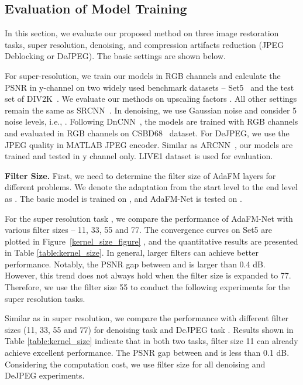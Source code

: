 \documentclass[10pt,twocolumn,letterpaper]{article}
\begin{document}
\subsection{Evaluation of Model Training}
In this section, we evaluate our proposed method on three image restoration tasks, super resolution, denoising, and compression artifacts reduction (JPEG Deblocking or DeJPEG). The basic settings are shown below. 

For super-resolution, we train our models in RGB channels and calculate the PSNR in y-channel on two widely used benchmark datasets -- Set5~\cite{bevilacqua2012low} and the test set of DIV2K~\cite{agustsson2017ntire}. We evaluate our methods on upscaling factors . All other settings remain the same as SRCNN~\cite{dong2014learning}. In denoising, we use Gaussian noise and consider 5 noise levels, i.e., . Following DnCNN~\cite{zhang2017beyond}, the models are trained with RGB channels and evaluated in RGB channels on CSBD68~\cite{roth2005fields} dataset. For DeJPEG, we use the JPEG quality  in MATLAB JPEG encoder. Similar as ARCNN~\cite{Dong_2015_ICCV}, our models are trained and tested in y channel only. LIVE1 \cite{1709988} dataset is used for evaluation.

\textbf{Filter Size.}
First, we need to determine the filter size of AdaFM layers for different problems. We denote the adaptation from the start level  to the end level  as . The basic model is trained on , and AdaFM-Net is tested on .

For the super resolution task , we compare the performance of AdaFM-Net with various filter sizes -- 11, 33, 55 and 77. The convergence curves on Set5 are plotted in Figure~\ref{kernel_size_figure} , and the quantitative results are presented in Table \ref{table:kernel_size}. In general, larger filters can achieve better performance. Notably, the PSNR gap between  and  is larger than 0.4 dB. However, this trend does not always hold when the filter size is expanded to 77. Therefore, we use the filter size 55 to conduct the following experiments for the super resolution tasks. 

Similar as in super resolution, we compare the performance with different filter sizes (11, 33, 55 and 77) for denoising task  and DeJPEG task . Results shown in Table \ref{table:kernel_size} indicate that in both two tasks, filter size 11 can already achieve excellent performance. The PSNR gap between  and  is less than 0.1 dB. Considering the computation cost, we use filter size  for all denoising and DeJPEG experiments.
\end{document}

